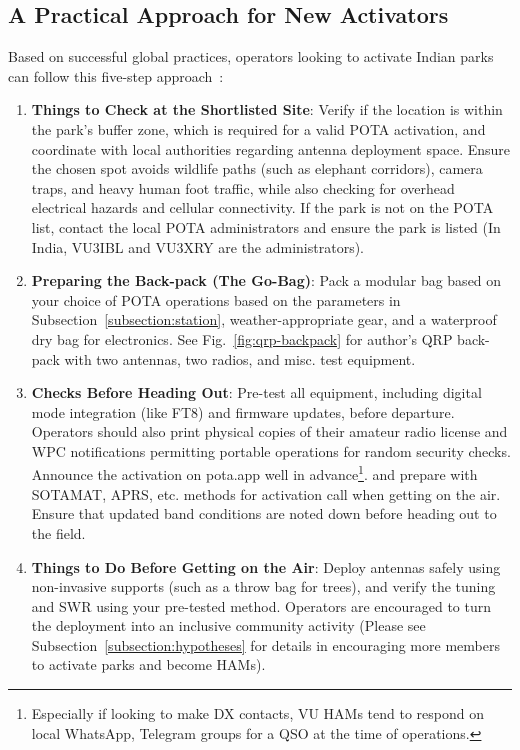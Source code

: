 \documentclass[conference]{IEEEtran}
\begin{document}
\subsection{A Practical Approach for New Activators}
Based on successful global practices, operators looking to activate
Indian parks can follow this five-step approach~\cite{b16}:
\begin{enumerate}
\item \textbf{Things to Check at the Shortlisted Site}: Verify if the
  location is within the park's buffer zone, which is required for a
  valid POTA activation, and coordinate with local authorities
  regarding antenna deployment space. Ensure the chosen spot
  avoids wildlife paths (such as elephant corridors), camera traps,
  and heavy human foot traffic, while also checking for overhead
  electrical hazards and cellular connectivity. If the park is not on
  the POTA list, contact the local POTA administrators and ensure the
  park is listed (In India, VU3IBL and VU3XRY are the administrators).
\item \textbf{Preparing the Back-pack (The Go-Bag)}: Pack a modular
  bag based on your choice of POTA operations based on the parameters
  in Subsection~\ref{subsection:station}, weather-appropriate gear,
  and a waterproof dry bag for electronics. See Fig.~\ref{fig:qrp-backpack} for author's QRP back-pack with two
  antennas, two radios, and misc. test equipment.
\item \textbf{Checks Before Heading Out}: Pre-test all equipment,
  including digital mode integration (like FT8) and firmware updates,
  before departure. Operators should also print physical copies of
  their amateur radio license and WPC notifications permitting
  portable operations for random security checks. Announce the
  activation on pota.app well in advance\footnote{Especially if
    looking to make DX contacts, VU HAMs tend to respond on local
    WhatsApp, Telegram groups for a QSO at the time of operations.}.
  and prepare with SOTAMAT, APRS, etc. methods for activation call
  when getting on the air. Ensure that updated band conditions are
  noted down before heading out to the field.
\item \textbf{Things to Do Before Getting on the Air}: Deploy antennas
  safely using non-invasive supports (such as a throw bag for trees),
  and verify the tuning and SWR using your pre-tested method. Operators are
  encouraged to turn the deployment into an inclusive community
  activity (Please see Subsection~\ref{subsection:hypotheses} for
  details in encouraging more members to activate parks and become HAMs).

\end{enumerate}
\end{document}
